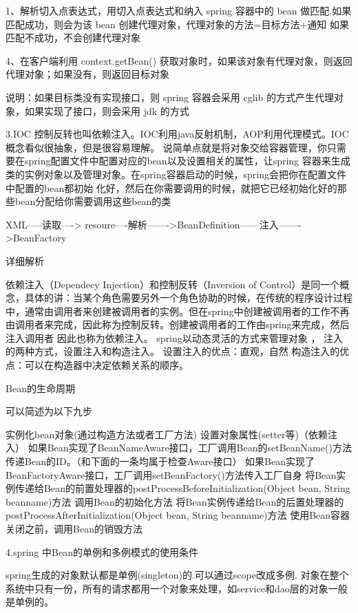 \documentclass[UTF8]{ctexart}
\begin{document}
 1、解析切入点表达式，用切入点表达式和纳入 spring 容器中的 bean 做匹配.如果匹配成功，则会为该 bean 创建代理对象，代理对象的方法=目标方法+通知 如果匹配不成功，不会创建代理对象

4、在客户端利用 context.getBean() 获取对象时，如果该对象有代理对象，则返回代理对象；如果没有，则返回目标对象

说明：如果目标类没有实现接口，则 spring 容器会采用 cglib 的方式产生代理对象，如果实现了接口，则会采用 jdk 的方式

3.IOC
控制反转也叫依赖注入。IOC利用java反射机制，AOP利用代理模式。IOC 概念看似很抽象，但是很容易理解。 说简单点就是将对象交给容器管理，你只需要在spring配置文件中配置对应的bean以及设置相关的属性，让spring 容器来生成类的实例对象以及管理对象。在spring容器启动的时候，spring会把你在配置文件中配置的bean都初始 化好，然后在你需要调用的时候，就把它已经初始化好的那些bean分配给你需要调用这些bean的类

XML–—读取––-> resoure----解析------->BeanDefinition––—注入––––->BeanFactory

详细解析

依赖注入（Dependecy Injection）和控制反转（Inversion of Control）是同一个概念，具体的讲：当某个角色需要另外一个角色协助的时候，在传统的程序设计过程中，通常由调用者来创建被调用者的实例。但在spring中创建被调用者的工作不再由调用者来完成，因此称为控制反转。创建被调用者的工作由spring来完成，然后注入调用者
因此也称为依赖注入。
spring以动态灵活的方式来管理对象 ， 注入的两种方式，设置注入和构造注入。
设置注入的优点：直观，自然
构造注入的优点：可以在构造器中决定依赖关系的顺序。

Bean的生命周期

可以简述为以下九步

实例化bean对象(通过构造方法或者工厂方法)
设置对象属性(setter等)（依赖注入）
如果Bean实现了BeanNameAware接口，工厂调用Bean的setBeanName()方法传递Bean的ID。（和下面的一条均属于检查Aware接口）
如果Bean实现了BeanFactoryAware接口，工厂调用setBeanFactory()方法传入工厂自身
将Bean实例传递给Bean的前置处理器的postProcessBeforeInitialization(Object bean, String beanname)方法
调用Bean的初始化方法
将Bean实例传递给Bean的后置处理器的postProcessAfterInitialization(Object bean, String beanname)方法
使用Bean容器关闭之前，调用Bean的销毁方法


4.spring 中Bean的单例和多例模式的使用条件

spring生成的对象默认都是单例(singleton)的.可以通过scope改成多例. 对象在整个系统中只有一份，所有的请求都用一个对象来处理，如service和dao层的对象一般是单例的。
\end{document}
